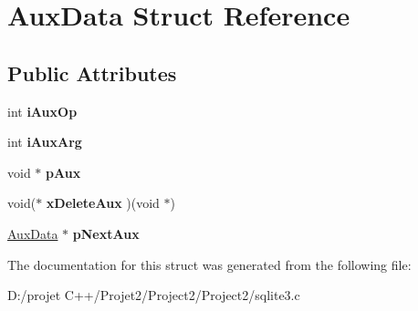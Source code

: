 \hypertarget{struct_aux_data}{}\section{Aux\+Data Struct Reference}
\label{struct_aux_data}
\subsection*{Public Attributes}
\begin{DoxyCompactItemize}
\item 
\mbox{\label{struct_aux_data_aa39240d49c18f6e31d7e83811ace1cdc}} 
int {\bfseries i\+Aux\+Op}
\item 
\mbox{\label{struct_aux_data_a517c90e8831eba9134d486ff9ca57248}} 
int {\bfseries i\+Aux\+Arg}
\item 
\mbox{\label{struct_aux_data_a3867fd2bd1f3795b14e858daa6754825}} 
void $\ast$ {\bfseries p\+Aux}
\item 
\mbox{\label{struct_aux_data_a148f6ff0790b7e53857bfc6f4e407bf2}} 
void($\ast$ {\bfseries x\+Delete\+Aux} )(void $\ast$)
\item 
\mbox{\label{struct_aux_data_ab562ec31ca37aa4bb11a5ce354731017}} 
\mbox{\hyperlink{struct_aux_data}{Aux\+Data}} $\ast$ {\bfseries p\+Next\+Aux}
\end{DoxyCompactItemize}


The documentation for this struct was generated from the following file\+:\begin{DoxyCompactItemize}
\item 
D\+:/projet C++/\+Projet2/\+Project2/\+Project2/sqlite3.\+c\end{DoxyCompactItemize}
